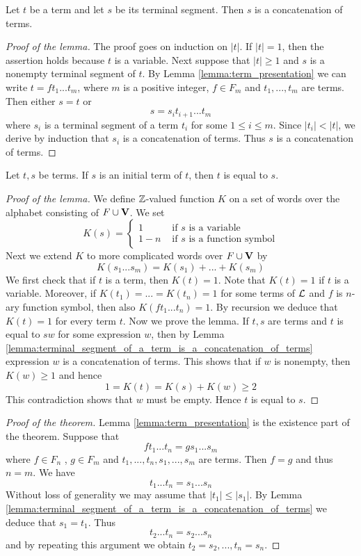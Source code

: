 \begin{lemma}\label{lemma:terminal_segment_of_a_term_is_a_concatenation_of_terms}
Let $t$ be a term and let $s$ be its terminal segment. Then $s$ is a concatenation of terms.
\end{lemma}
\begin{proof}[Proof of the lemma]
The proof goes on induction on $|t|$. If $|t| = 1$, then the assertion holds because $t$ is a variable. Next suppose that $|t| \geq 1$ and $s$ is a nonempty terminal segment of $t$. By Lemma \ref{lemma:term_presentation} we can write $t = ft_1...t_m$, where $m$ is a positive integer, $f \in F_m$ and $t_1,...,t_m$ are terms. Then
either $s = t$ or
$$s = s_it_{i+1}...t_m$$
where $s_i$ is a terminal segment of a term $t_i$ for some $1 \leq i \leq m$. Since $|t_i|<|t|$, we derive by induction that $s_i$ is a concatenation of terms. Thus $s$ is a concatenation of terms.
\end{proof}

\begin{lemma}
Let $t,s$ be terms. If $s$ is an initial term of $t$, then $t$ is equal to $s$.
\end{lemma}
\begin{proof}[Proof of the lemma]
We define ${\mathbb Z}$-valued function $K$ on a set of words over the alphabet consisting of $F \cup \mathbf{V}$. We set
$$K(s) =\begin{cases}1 & \mbox{ if }s\mbox{ is a variable}\\
1-n & \mbox{ if }s\mbox{ is a function symbol}
\end{cases}$$
Next we extend $K$ to more complicated words over $F \cup \mathbf{V}$ by
$$K(s_1 ...s_m) = K(s_1) + ... + K(s_m)$$
We first check that if $t$ is a term, then $K(t) = 1$. Note that $K(t) = 1$ if $t$ is a variable. Moreover, if $K(t_1) = ... = K(t_n) = 1$ for some terms of ${\mathcal L}$ and $f$ is $n$-ary function symbol, then also $K( ft_1...t_n) = 1$.
By recursion we deduce that $K(t) = 1$ for every term $t$. Now we prove the lemma. If $t, s$ are terms and $t$ is equal to $sw$ for some expression $w$, then by Lemma \ref{lemma:terminal_segment_of_a_term_is_a_concatenation_of_terms} expression $w$ is a concatenation of terms. This shows that if $w$ is nonempty, then $K(w) \geq 1$ and hence
$$1 = K(t) = K(s) + K(w) \geq 2$$
This contradiction shows that $w$ must be empty. Hence $t$ is equal to $s$.
\end{proof}

\begin{proof}[Proof of the theorem]
Lemma \ref{lemma:term_presentation} is the existence part of the theorem. Suppose that
$$ft_1 ...t_n = gs_1 ...s_m$$
where $f \in F_n$ , $g \in F_m$ and $t_1, ..., t_n , s_1 , ..., s_m$ are terms. Then $f = g$ and thus $n = m$. We have
$$t_1 ...t_n = s_1 ...s_n$$
Without loss of generality we may assume that $|t_1| \leq |s_1|$. By Lemma \ref{lemma:terminal_segment_of_a_term_is_a_concatenation_of_terms} we deduce that $s_1 = t_1$.
Thus
$$t_2 ...t_n = s_2 ...s_n$$
and by repeating this argument we obtain $t_2 = s_2 ,...,t_n = s_n$.
\end{proof}
 
